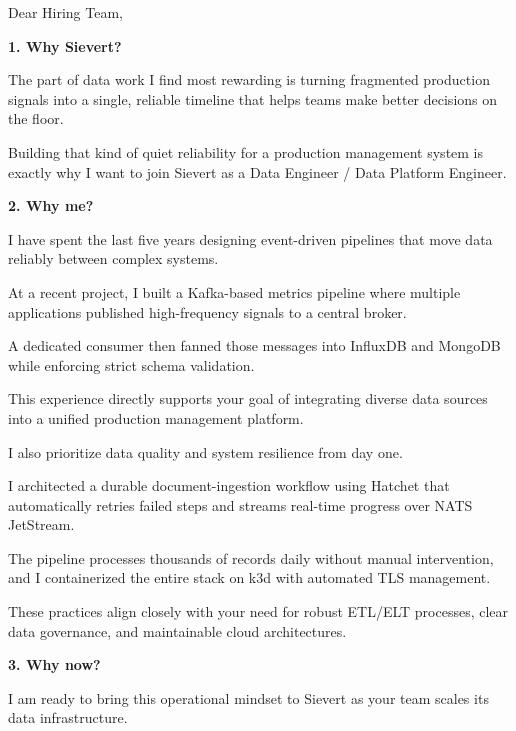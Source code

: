\documentclass[11pt,a4paper]{coverletter}
\begin{document}

\opening{Dear Hiring Team,}

\vspace{8pt}\noindent\textbf{1. Why Sievert?}\par\vspace{3pt}

The part of data work I find most rewarding is turning fragmented production signals into a single, reliable timeline that helps teams make better decisions on the floor.

Building that kind of quiet reliability for a production management system is exactly why I want to join Sievert as a Data Engineer / Data Platform Engineer.

\vspace{8pt}\noindent\textbf{2. Why me?}\par\vspace{3pt}

I have spent the last five years designing event-driven pipelines that move data reliably between complex systems.

At a recent project, I built a Kafka-based metrics pipeline where multiple applications published high-frequency signals to a central broker.

A dedicated consumer then fanned those messages into InfluxDB and MongoDB while enforcing strict schema validation.

This experience directly supports your goal of integrating diverse data sources into a unified production management platform.

I also prioritize data quality and system resilience from day one.

I architected a durable document-ingestion workflow using Hatchet that automatically retries failed steps and streams real-time progress over NATS JetStream.

The pipeline processes thousands of records daily without manual intervention, and I containerized the entire stack on k3d with automated TLS management.

These practices align closely with your need for robust ETL/ELT processes, clear data governance, and maintainable cloud architectures.

\vspace{8pt}\noindent\textbf{3. Why now?}\par\vspace{3pt}

I am ready to bring this operational mindset to Sievert as your team scales its data infrastructure.
\end{document}
